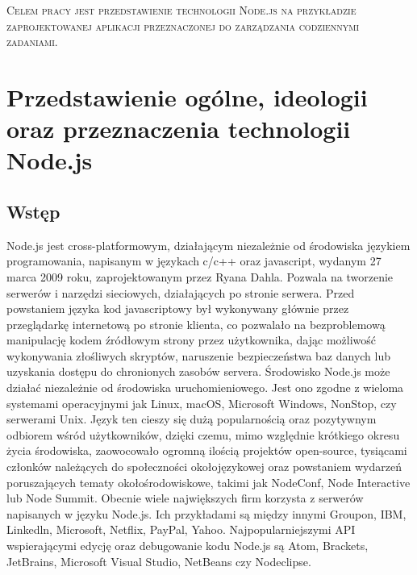\documentclass[12pt]{report}
\begin{document}
\begin{titlepage}
	\centering
	{\scshape\LARGE Celem pracy jest przedstawienie technologii Node.js na przykładzie zaprojektowanej aplikacji przeznaczonej do zarządzania codziennymi zadaniami.  \par}
\end{titlepage}
\tableofcontents

\chapter{Przedstawienie ogólne, ideologii oraz przeznaczenia technologii Node.js}

\section{Wstęp}
Node.js jest cross-platformowym, działającym niezależnie od środowiska językiem programowania, napisanym w językach c/c++ oraz javascript, wydanym 27 marca 2009 roku, zaprojektowanym przez Ryana Dahla. 
Pozwala na tworzenie serwerów i narzędzi sieciowych, działających po stronie serwera. 
Przed powstaniem języka kod javascriptowy był wykonywany głównie przez przeglądarkę internetową po stronie klienta, co pozwalało na bezproblemową manipulację kodem źródłowym strony przez użytkownika, dając możliwość wykonywania złośliwych skryptów, naruszenie bezpieczeństwa baz danych lub uzyskania dostępu do chronionych zasobów servera. 
Środowisko Node.js może działać niezależnie od środowiska uruchomieniowego. 
Jest ono zgodne z wieloma systemami operacyjnymi jak  Linux, macOS, Microsoft Windows, NonStop, czy serwerami Unix. 
Język ten cieszy się dużą popularnością oraz pozytywnym odbiorem wśród użytkowników, dzięki czemu, mimo względnie krótkiego okresu życia środowiska, zaowocowało ogromną ilością projektów open-source, tysiącami członków należących do społeczności okołojęzykowej oraz powstaniem wydarzeń poruszających tematy okołośrodowiskowe, takimi jak NodeConf, Node Interactive lub Node Summit. 
Obecnie wiele największych firm korzysta z serwerów napisanych w języku Node.js. 
Ich przykładami są między innymi Groupon, IBM, Linkedln, Microsoft, Netflix, PayPal, Yahoo. 
Najpopularniejszymi API wspierającymi edycję oraz debugowanie kodu Node.js są Atom, Brackets, JetBrains, Microsoft Visual Studio, NetBeans czy Nodeclipse.
\end{document}
